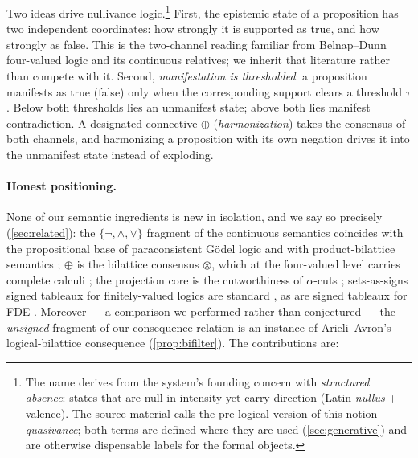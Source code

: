 \documentclass[11pt,a4paper]{article}
\theoremstyle{definition}
\newcommand{\hmz}{\oplus}                       %
\begin{document}
Two ideas drive nullivance logic.\footnote{The name derives from the
system's founding concern with \emph{structured absence}: states that are
null in intensity yet carry direction (Latin \emph{nullus} + valence). The
source material calls the pre-logical version of this notion
\emph{quasivance}; both terms are defined where they are used
(\cref{sec:generative}) and are otherwise dispensable labels for the formal
objects.} First, the epistemic state of a proposition has two independent
coordinates: how strongly it is supported as true, and how strongly as
false. This is the two-channel reading familiar from Belnap--Dunn
four-valued logic \cite{belnap1977useful,belnap1977computer,
dunn1976intuitive} and its continuous relatives; we inherit that literature
rather than compete with it. Second, \emph{manifestation is thresholded}: a
proposition manifests as true (false) only when the corresponding support
clears a threshold $\tau$. Below both thresholds lies an unmanifest state;
above both lies manifest contradiction. A designated connective $\hmz$
(\emph{harmonization}) takes the consensus of both channels, and
harmonizing a proposition with its own negation drives it into the
unmanifest state instead of exploding.

\paragraph{Honest positioning.} None of our semantic ingredients is new in
isolation, and we say so precisely (\cref{sec:related}): the
$\{\lnot,\wedge,\vee\}$ fragment of the continuous semantics coincides with
the propositional base of paraconsistent G\"odel logic
\cite{bilkova2022paraconsistent} and with product-bilattice semantics
\cite{ginsberg1988multivalued,fitting1991bilattices}; $\hmz$ is the
bilattice consensus $\otimes$, which at the four-valued level carries
complete calculi \cite{arieli1996reasoning}; the projection core is the
cutworthiness of $\alpha$-cuts \cite[\S\S~1.3--1.4]{klir1995fuzzy}; sets-as-signs
signed tableaux for finitely-valued logics are standard
\cite{haehnle1994automated}, as are signed tableaux for FDE
\cite[Ch.~8]{priest2008introduction}. Moreover --- a comparison we performed rather than
conjectured --- the \emph{unsigned} fragment of our consequence relation is
an instance of Arieli--Avron's logical-bilattice consequence
(\cref{prop:bifilter}). The contributions are:
\end{document}
